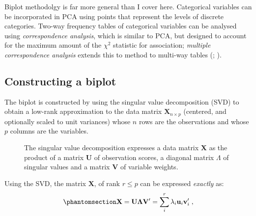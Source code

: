 \documentclass[
  letterpaper,
  10pt,
  krantz2]{krantz}
\begin{document}
Biplot methodolgy is far more general than I cover here. Categorical
variables can be incorporated in PCA using points that represent the
levels of discrete categories. Two-way frequency tables of categorical
variables can be analysed using \emph{correspondence analysis}, which is
similar to PCA, but designed to account for the maximum amount of the
\(\chi^2\) statistic for association; \emph{multiple correspondence
analysis} extends this to method to multi-way tables
(;
).

\subsection{Constructing a biplot}\label{constructing-a-biplot}

The biplot is constructed by using the singular value decomposition
(SVD) to obtain a low-rank approximation to the data matrix
\(\mathbf{X}_{n \times p}\) (centered, and optionally scaled to unit
variances) whose \(n\) rows are the observations and whose \(p\) columns
are the variables.

\begin{figure}


\caption{\label{fig-svd-diagram}The singular value decomposition
expresses a data matrix \textbf{X} as the product of a matrix \textbf{U}
of observation scores, a diagonal matrix \(\Lambda\) of singular values
and a matrix \textbf{V} of variable weights.}

\end{figure}%

Using the SVD, the matrix \(\mathbf{X}\), of rank \(r \le p\) can be
expressed \emph{exactly} as:
\begin{equation}\phantomsection\label{eq-svd1}{
\mathbf{X} = \mathbf{U} \mathbf{\Lambda} \mathbf{V}'
                 = \sum_i^r \lambda_i \mathbf{u}_i \mathbf{v}_i' \; ,
}\end{equation}
\end{document}
